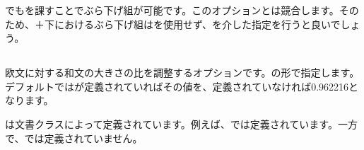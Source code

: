 \documentclass[../otf-unofficial-guide]{subfiles}
\begin{document}
でもを課すことでぶら下げ組が可能です。このオプションとは競合します。そのため、\inhibitkanjiskip＋\inhibitkanjiskip{}下におけるぶら下げ組はを使用せず、を介した指定を行うと良いでしょう。

\subsection{\texorpdfstring{}{scaleオプション}}

欧文に対する和文の大きさの比を調整するオプションです。の形で指定します。デフォルトではが定義されていればその値を、定義されていなければ0.962216となります。

は文書クラスによって定義されています。例えば、では定義されています。一方で、では定義されていません。
\end{document}
